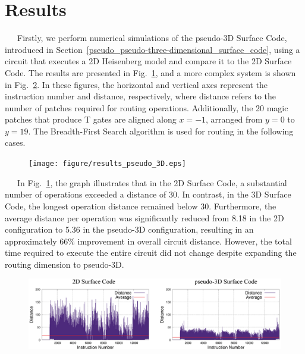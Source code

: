 \documentclass[a4paper,11pt]{ltjsarticle}
\begin{document}
\section{Results}\label{results}{
    \ \ \ Firstly, we perform numerical simulations of the pseudo-3D Surface Code, introduced in Section~\ref{pseudo_pseudo-three-dimensional_surface_code}, using a circuit that executes a 2D Heisenberg model and compare it to the 2D Surface Code. The results are presented in Fig.~\ref{results_of_pseudo_3D}, and a more complex system is shown in Fig.~\ref{results_of_pseudo_3D_1}. In these figures, the horizontal and vertical axes represent the instruction number and distance, respectively, where distance refers to the number of patches required for routing operations. Additionally, the 20 magic patches that produce T gates are aligned along $x = -1$, arranged from $y = 0$ to $y = 19$. The Breadth-First Search algorithm is used for routing in the following cases.

    \begin{figure}[h]
        \centering
        \texttt{[image: figure/results\_pseudo\_3D.eps]}
        \vspace{-20pt}\caption{}
        \label{results_of_pseudo_3D}
    \end{figure}

    \ \ \ In Fig.~\ref{results_of_pseudo_3D}, the graph illustrates that in the 2D Surface Code, a substantial number of operations exceeded a distance of 30. In contrast, in the 3D Surface Code, the longest operation distance remained below 30. Furthermore, the average distance per operation was significantly reduced from 8.18 in the 2D configuration to 5.36 in the pseudo-3D configuration, resulting in an approximately 66\% improvement in overall circuit distance. However, the total time required to execute the entire circuit did not change despite expanding the routing dimension to pseudo-3D.

    \begin{figure}[h]
        \centering
        \includegraphics[scale=0.5]{figure/results_pseudo_3D_1.eps}
        \vspace{-20pt}\caption{}
        \label{results_of_pseudo_3D_1}
    \end{figure}

}
\end{document}
